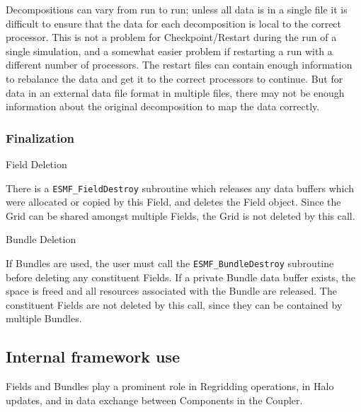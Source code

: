 \begin{description}
\begin{description}
Decompositions can vary from run to run; unless all data
is in a single file it is difficult to ensure that the data for
each decomposition is local to the correct processor.  This is
not a problem for Checkpoint/Restart during the run of a
single simulation, and a somewhat easier problem if restarting
a run with a different number of processors.  The restart files
can contain enough information to rebalance the data and get it
to the correct processors to continue.  But for data in an 
external data file format in multiple files, 
there may not be enough information about the original decomposition
to map the data correctly.

\end{description}

\end{description}

\subsubsection{Finalization}

\begin{description}

\item{Field Deletion}

There is a {\tt ESMF\_FieldDestroy} subroutine which releases
any data buffers which were allocated or copied by this Field,
and deletes the Field object.  Since the Grid can be shared
amongst multiple Fields, the Grid is not deleted by this call.

\item{Bundle Deletion}

If Bundles are used, the user must call the 
{\tt ESMF\_BundleDestroy} subroutine before deleting any constituent
Fields.  If a private Bundle data buffer exists, the space is
freed and all resources associated with the Bundle are released.
The constituent Fields are not deleted by this call, since they
can be contained by multiple Bundles.

\end{description}


\subsection{Internal framework use}

Fields and Bundles play a prominent role in Regridding operations,
in Halo updates,  
and in data exchange between Components in the Coupler.

